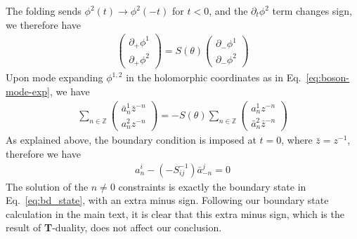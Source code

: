 The folding sends $\phi^2(t)\rightarrow\phi^2(-t)$ for $t<0$, and the $\partial_t \phi^2$ term changes sign, we therefore have 
\begin{equation}
\begin{aligned}
\label{eq:def_S_in_app_2}
\begin{pmatrix}
\partial_+\phi^1\\
\partial_+\phi^2
\end{pmatrix}
=S(\theta)
\begin{pmatrix}
\partial_-\phi^1\\
\partial_-\phi^2
\end{pmatrix}
\end{aligned}
\end{equation}
Upon mode expanding $\phi^{1,2}$ in the holomorphic coordinates as in Eq.~\eqref{eq:boson-mode-exp}, we have
\begin{equation}
\begin{aligned}
\label{eq:def_S_in_app_2}
\sum_{n\in\mathbb{Z}}
\begin{pmatrix}
\bar{a}_n^1\bar{z}^{-n}\\
a_n^2z^{-n}
\end{pmatrix}
=-S(\theta)
\sum_{n\in\mathbb{Z}}
\begin{pmatrix}
a_n^1{z}^{-n}\\
\bar{a}_n^2\bar{z}^{-n}
\end{pmatrix}
\end{aligned}
\end{equation}
As explained above, the boundary condition is imposed at $t=0$, where $\bar{z}=z^{-1}$, therefore we have
\begin{equation}\begin{aligned}
a^i_n-(-S^{-1}_{ij})\bar{a}^j_{-n}=0
\end{aligned}\end{equation}
The solution of the $n \neq 0$ constraints is exactly the boundary state in Eq.~\eqref{eq:bd_state}, with an extra minus sign. Following our boundary state calculation in the main text, it is clear that this extra minus sign, which is the result of {\bf T}-duality, does not affect our conclusion.

